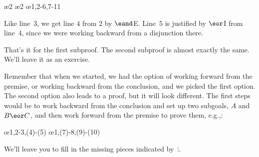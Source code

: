 \begin{fitchproof}
	\open
	\ae{2}
	\ae{2}
	\close
	\open
	\ellipsesline
	\close
	\oe{1,2-6,7-11}
\end{fitchproof}
Like line~$3$, we get line $4$ from $2$ by $\eand$E. Line~$5$ is justified by $\eor$I from line~$4$, since we were working backward from a disjunction there.

That's it for the first subproof. The second subproof is almost exactly the same. We'll leave it as an exercise.

Remember that when we started, we had the option of working forward from the premise, or working backward from the conclusion, and we picked the first option. The second option also leads to a proof, but it will look different.  The first steps would be to work backward from the conclusion and set up two subgoals, $A$ and $B \eor C$, and then work forward from the premise to prove them, e.g.,:
\begin{fitchproof}
	\open
	\ellipsesline
	\close
	\open
	\ellipsesline
	\close
	\oe{1,2-3,(4)-(5)}
	\open
	\ellipsesline
	\close
	\open
	\ellipsesline
	\close
	\oe{1,(7)-8,(9)-(10)}	
\end{fitchproof}
We'll leave you to fill in the missing pieces indicated by~$\vdots$.

